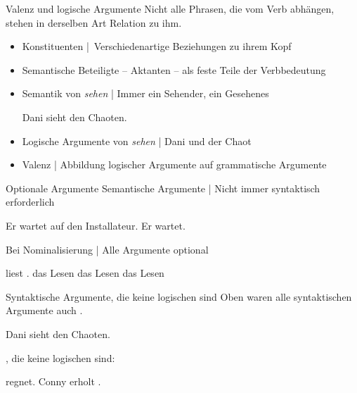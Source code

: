\begin{frame}
  {Valenz und logische Argumente}
  \onslide<+->
  \onslide<+->
  Nicht alle Phrasen, die vom Verb abhängen, stehen in derselben Art Relation zu ihm.\\
  \Zeile
  \begin{itemize}[<+->]
    \item Konstituenten | Verschiedenartige Beziehungen zu ihrem Kopf
    \item Semantische Beteiligte -- \alert{Aktanten} -- als \alert{feste Teile der Verbbedeutung}
    \item Semantik von \textit{sehen} | Immer ein \alert{Sehender}, ein \alert{Gesehenes}
      \Viertelzeile
      \begin{exe}
       \ex Dani sieht den Chaoten.
      \end{exe}
    \item \alert{Logische Argumente von \textit{sehen}} | Dani und der Chaot
    \item Valenz | Abbildung logischer Argumente auf grammatische Argumente
  \end{itemize}
\end{frame}

\begin{frame}
  {Optionale Argumente}
  \onslide<+->
  \onslide<+->
  Semantische Argumente | Nicht immer syntaktisch erforderlich\\
  \onslide<+->
  \Halbzeile
    \begin{exe}
      \ex Er wartet \alert{auf den Installateur}.
      \ex Er wartet.
    \end{exe}
  \onslide<+->
  \Zeile
  Bei \alert{Nominalisierung} | Alle Argumente optional\\
  \onslide<+->
  \Halbzeile
    \begin{exe}
      \ex {} \alert{liest} .
      \ex \alert{das Lesen}  
      \ex \alert{das Lesen}  
      \ex \alert{das Lesen} 
    \end{exe}
\end{frame}



\begin{frame}
  {Syntaktische Argumente, die keine logischen sind}
  \onslide<+->
  \onslide<+->
  Oben waren alle \alert{syntaktischen Argumente} auch .\\
  \onslide<+->
  \Halbzeile
  \begin{exe}
    \ex \alert{Dani} sieht \alert{den Chaoten}.
  \end{exe}
  \onslide<+->
  \Zeile
  , die keine logischen sind:\\
  \Halbzeile
  \onslide<+->
  \begin{exe}
    \ex {} regnet.
    \ex Conny erholt .
  \end{exe}
\end{frame}


